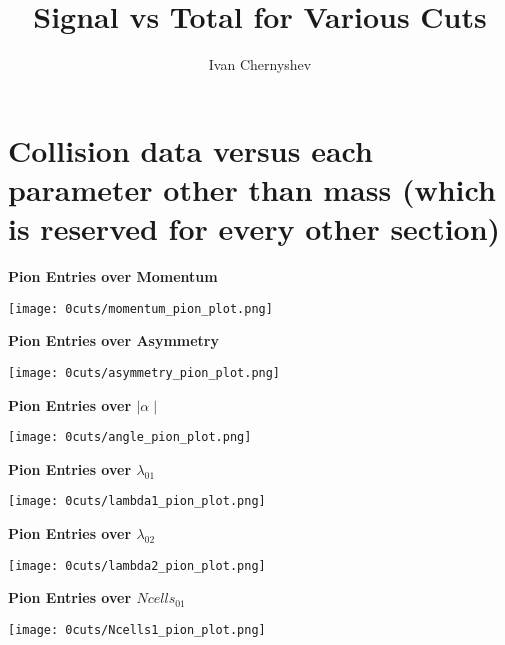 \documentclass[11pt]{article}
\title{Signal vs Total for Various Cuts}
\author{Ivan Chernyshev}
\begin{document}
\maketitle

\section{Collision data versus each parameter other than mass (which is reserved for every other section)}

\begin{frame}{} %
\centering
\textbf{Pion Entries over Momentum}\par\medskip
\texttt{[image: 0cuts/momentum\_pion\_plot.png]}
\end{frame}

\begin{frame}{} %
\centering
\textbf{Pion Entries over Asymmetry}\par\medskip
\texttt{[image: 0cuts/asymmetry\_pion\_plot.png]}
\end{frame}

\begin{frame}{} %
\centering
\textbf{Pion Entries over $\mid\alpha\mid$}\par\medskip
\texttt{[image: 0cuts/angle\_pion\_plot.png]}
\end{frame}

\begin{frame}{} %
\centering
\textbf{Pion Entries over $\lambda_{01}$}\par\medskip
\texttt{[image: 0cuts/lambda1\_pion\_plot.png]}
\end{frame}


\begin{frame}{} %
\centering
\textbf{Pion Entries over $\lambda_{02}$}\par\medskip
\texttt{[image: 0cuts/lambda2\_pion\_plot.png]}
\end{frame}

\begin{frame}{} %
\centering
\textbf{Pion Entries over $Ncells_{01}$}\par\medskip
\texttt{[image: 0cuts/Ncells1\_pion\_plot.png]}
\end{frame}
\end{document}
